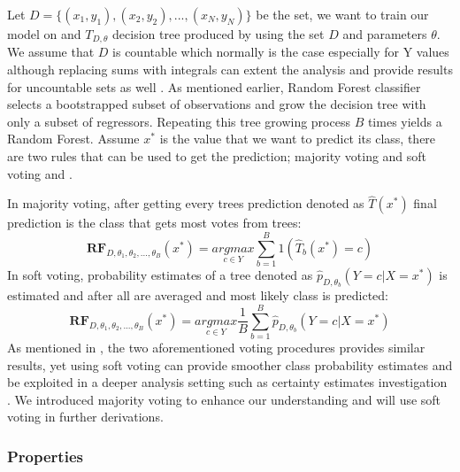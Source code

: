 Let $D = \{(x_{1},y_{1}), (x_{2}, y_{2}), ... , (x_{N}, y_{N})\}$ be the set, we want to train our model on and $T_{D, \theta}$ 
decision tree produced by using the set $D$ and parameters $\theta$. We assume that $D$ is countable which normally is the 
case especially for Y values although replacing sums with integrals can extent the analysis and 
provide results for uncountable sets as well \cite{kohavi1996bias}. As mentioned earlier, 
Random Forest classifier selects a bootstrapped subset of observations and 
grow the decision tree with only a subset of regressors. Repeating this tree growing process $B$ times 
yields a Random Forest. Assume $x^*$ is the value that we want to predict its class, 
there are two rules that can be used to get the prediction; majority voting and 
soft voting \cite{louppe2014understanding} and \cite{zhou2012ensemble}.

In majority voting, after getting every trees prediction denoted as $\hat{T}(x^*)$ final prediction is the class that gets most votes from trees:
\begin{equation}
\boldsymbol{RF}_{D, \theta_{1}, \theta_{2}, ..., \theta_{B}} (x^*) =
	\underset{c \in Y}{argmax} \sum_{b = 1}^{B}{1(\hat{T}_{b}(x^*) = c)}
\end{equation}
In soft voting, probability estimates of a tree denoted as $\hat{p}_{D, \theta_{b}} (Y = c | X = x^*)$ is estimated and after all are averaged and most likely class is predicted:
\begin{equation}
\boldsymbol{RF}_{D, \theta_{1}, \theta_{2}, ..., \theta_{B}} (x^*) =
	\underset{c \in Y}{argmax} \dfrac{1}{B}\sum_{b = 1}^{B}{\hat{p}_{D, \theta_{b}} (Y = c | X = x^*)}
\end{equation}
As mentioned in \cite{breiman1996bagging}, the two aforementioned voting procedures provides similar results, 
yet using soft voting can provide smoother class probability estimates and be exploited in a deeper analysis setting such as 
certainty estimates investigation \cite{louppe2014understanding}. 
We introduced majority voting to enhance our understanding and will use soft voting in further derivations. 

\subsubsection{Properties}

